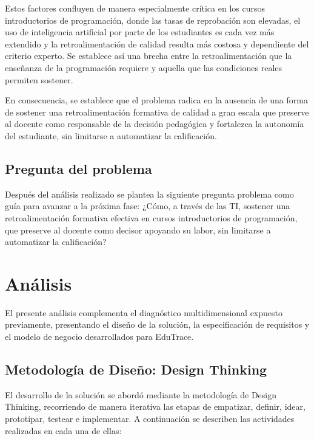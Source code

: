 \documentclass[letterpaper, 10 pt, conference]{ieeeconf}
\begin{document}
Estos factores confluyen de manera especialmente crítica en los cursos introductorios de programación, donde las tasas de reprobación son elevadas, el uso de inteligencia artificial por parte de los estudiantes es cada vez más extendido y la retroalimentación de calidad resulta más costosa y dependiente del criterio experto. Se establece así una brecha entre la retroalimentación que la enseñanza de la programación requiere y aquella que las condiciones reales permiten sostener.

En consecuencia, se establece que el problema radica en la ausencia de una forma de sostener una retroalimentación formativa de calidad a gran escala que preserve al docente como responsable de la decisión pedagógica y fortalezca la autonomía del estudiante, sin limitarse a automatizar la calificación. 


\subsection{Pregunta del problema} 

Después del análisis realizado se plantea la siguiente pregunta problema como guía para avanzar a la próxima fase: ¿Cómo, a través de las TI, sostener una retroalimentación formativa efectiva en cursos introductorios de programación, que preserve al docente como decisor apoyando su labor, sin limitarse a automatizar la calificación?



\section{Análisis}

El presente análisis complementa el diagnóstico multidimensional expuesto previamente, presentando el diseño de la solución, la especificación de requisitos y el modelo de negocio desarrollados para EduTrace.

\subsection{Metodología de Diseño: Design Thinking}
El desarrollo de la solución se abordó mediante la metodología de Design Thinking, recorriendo de manera iterativa las etapas de empatizar, definir, idear, prototipar, testear e implementar. A continuación se describen las actividades realizadas en cada una de ellas:
\end{document}
